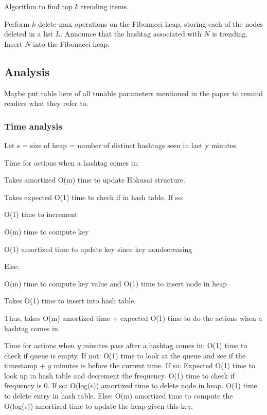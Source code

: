 \documentclass[a4paper,12pt]{article}
\begin{document}
\begin{algorithm}
\caption{Algorithm to find top $k$ trending items.}
\begin{algorithmic}[1]
\State Perform $k$ delete-max operations on the Fibonacci heap, storing each of the nodes deleted in a list $L$.
	\State Announce that the hashtag associated with $N$ is trending.
	\State Insert $N$ into the Fibonacci heap.
\EndFor
\end{algorithmic}
\end{algorithm}



\subsection{Analysis}

Maybe put table here of all tunable parameters mentioned in the paper to remind readers what they refer to.

\subsubsection{Time analysis}

Let s = size of heap = number of distinct hashtags seen in last y minutes.

Time for actions when a hashtag comes in:

	Takes amortized O(m) time to update Hokusai structure.

	Takes expected O(1) time to check if in hash table.  If so:

		O(1) time to increment

		O(m) time to compute key 

		O(1) amortized time to update key since key nondecreasing

	Else: 

		O(m) time to compute key value and O(1) time to insert node in heap

		Takes O(1) time to insert into hash table. 


Thus, takes O(m) amortized time + expected O(1) time to do the actions when a hashtag comes in.


Time for actions when $y$ minutes pass after a hashtag comes in:
	O(1) time to check if queue is empty.  If not:
		O(1) time to look at the queue and see if the timestamp + $y$ minutes is before the current time.  If so:
			Expected O(1) time to look up in hash table and decrement the frequency.
			O(1) time to check if frequency is 0.  If so:
				O(log(s)) amortized time to delete node in heap.
				O(1) time to delete entry in hash table.
			Else:
				O(m) amortized time to compute the 
				O(log(s)) amortized time to update the heap given this key.
\end{document}

